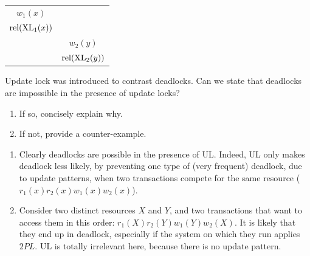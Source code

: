 \documentclass[12pt, a4paper]{report}
\newtheorem[style=M,bodystyle=\normalfont]{theorem}{Theorem}
\newtheorem[style=M,bodystyle=\normalfont]{corollary}{Corollary}
\newtheorem[style=M,bodystyle=\normalfont]{lemma}{Lemma}
\newtheorem[style=M,bodystyle=\normalfont]{definition}{Definition}
\begin{document}
\begin{Answer}[ref=11]
\begin{table}[H]
\begin{tabular}{|c|c|}
            $w_1(x)$                                      &                                               \\
            $\textnormal{rel}(\textnormal{XL}_1(x))$      &                                               \\
                                                          & $w_2(y)$                                      \\
                                                          & $\textnormal{rel}(\textnormal{XL}_2(y))$      \\ \hline
            \end{tabular}
        \end{table}
    \end{Answer}

    \newpage

    \begin{Exercise}[label=12]
        Update lock was introduced to contrast deadlocks. Can we state that deadlocks are impossible in the presence of update locks?
        \begin{enumerate}
            \item If so, concisely explain why. 
            \item If not, provide a counter-example.
        \end{enumerate}
    \end{Exercise}
    \begin{Answer}[ref=12]
        \begin{enumerate}
            \item Clearly deadlocks are possible in the presence of UL. Indeed, UL only makes deadlock less likely, by preventing one type of (very frequent) deadlock, due to 
                update patterns, when two transactions compete for the same resource ($r_1(x) r_2(x) w_1(x) w_2(x)$). 
            \item Consider two distinct resources $X$ and $Y$, and two transactions that want to access them in this order: $r_1(X) r_2(Y) w_1(Y) w_2(X)$. It is likely that they end up 
                in deadlock, especially if the system on which they run applies $2PL$. UL is totally irrelevant here, because there is no update pattern. 
        \end{enumerate}
    \end{Answer}

\newpage
\end{document}
